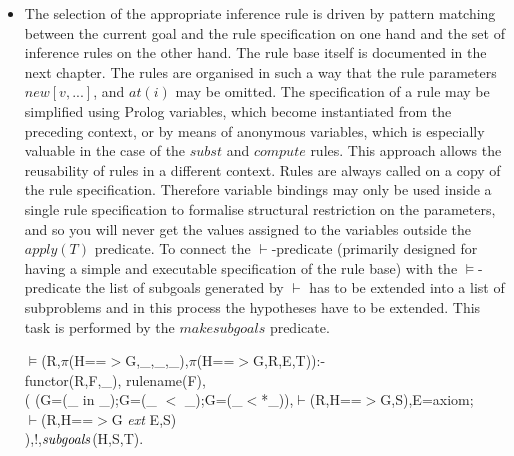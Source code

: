 \documentclass[11pt]{report}
\begin{document}
\begin{itemize}
 \item
 The selection of the appropriate inference 
 rule is driven by pattern matching between the
 current goal and the rule specification on one hand and the set of
 inference rules on the other hand. The rule base itself
 is documented in the next chapter. The rules are organised in such a
 way that the rule parameters $new[v,...]$, and $at(i)$
 may be omitted.
 The specification of a rule may be simplified using Prolog
 variables, which become instantiated from the preceding context,
 or by means of anonymous variables, which is especially valuable in 
 the case of the $subst$ and $compute$ rules. This approach allows the
 reusability of rules in a different context. Rules are always called 
 on a copy of the rule specification. Therefore variable bindings
 may only be used inside a single rule specification to formalise
 structural restriction on the parameters, and so you will never get the
 values assigned to the variables outside the $apply(T)$ predicate.
 To connect the $\vdash$-predicate (primarily designed for 
 having a simple and executable specification of the rule base)
 with the $\models$-predicate the list of subgoals generated by
 $\vdash$ has to be extended into a list of subproblems and
 in this process the hypotheses have to be extended. This
 task is performed by the $makesubgoals$ predicate.   
\begin{sf}\begin{tabbing}
$\models$(R,$\pi$(H==$>$G,\_\hspace{0.1em},\_\hspace{0.1em},\_\hspace{0.1em}),$\pi$(H==$>$G,R,E,T)):- \\[-0.15ex]
\hspace{2em}functor(R,F,\_\hspace{0.1em}), rulename(F),\\[-0.15ex]
\hspace{2em}( (G=(\_\hspace{0.1em} in \_\hspace{0.1em});G=(\_\hspace{0.1em} $<$ \_\hspace{0.1em});G=(\_\hspace{0.1em}$<$*\_\hspace{0.1em})),$\vdash$(R,H==$>$G,S),E=axiom;\\[-0.15ex]
\hspace{3em}$\vdash$(R,H==$>$G \mbox{\it ext} E,S)\\[-0.15ex]
\hspace{2em}),!,${\it subgoals}$(H,S,T).\\[-0.7ex]


\end{tabbing}
\end{sf}
\end{itemize}
\end{document}
